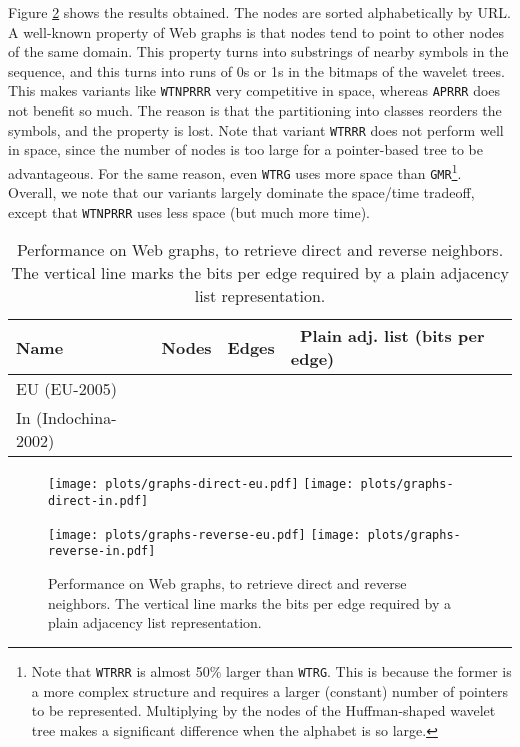 \documentclass[11pt]{article}
\begin{document}
\begin{table}[t]
{\begin{tabular}
Figure \ref{fig:graphs} shows the results obtained. The nodes are sorted
alphabetically by URL. A well-known property of Web graphs \cite{BV04} is that 
nodes tend to point to other nodes of the same domain. This property turns into
substrings of nearby symbols in the sequence, and this turns into runs of
0s or 1s in the bitmaps of the wavelet trees. This makes variants like
\texttt{WTNPRRR} very competitive in space, whereas \texttt{APRRR} does not
benefit so much. The reason is that the partitioning into
classes reorders the symbols, and the property is lost. Note that variant
{\tt WTRRR} does not perform well in space, since the number of nodes is too
large for a pointer-based tree to be advantageous. For the same reason, even
{\tt WTRG} uses more space than {\tt GMR}\footnote{Note that \texttt{WTRRR} is
almost 50\% larger than \texttt{WTRG}. This is because the former is a more
complex structure and requires a larger (constant) number of pointers to be
represented. Multiplying by the  nodes of the Huffman-shaped wavelet
tree makes a significant difference when the alphabet is so large.}.
Overall, we note that our variants largely dominate the space/time tradeoff,
except that \texttt{WTNPRRR} uses less space (but much more time).

\begin{table}
\begin{center}
\begin{tabular}{l|c|c|l}
{ Name} & {Nodes } & {Edges } & ~Plain adj. list (bits per edge)\\
\hline
EU (EU-2005) &  &  &  \\
In (Indochina-2002) &  &  &  \\
\end{tabular}
\caption{Description of the Web crawls considered.}
\label{tab:crawls}
\end{center}
\end{table}

\begin{figure}[tb]
\centerline{\texttt{[image: plots/graphs-direct-eu.pdf]}
\texttt{[image: plots/graphs-direct-in.pdf]}}

\centerline{\texttt{[image: plots/graphs-reverse-eu.pdf]}
\texttt{[image: plots/graphs-reverse-in.pdf]}}
\caption{Performance on Web graphs, to retrieve direct and reverse neighbors. The vertical line marks the bits per edge required by a plain adjacency list representation.}
\label{fig:graphs}
\end{figure}



\end{tabular}}
\end{table}
\end{document}
